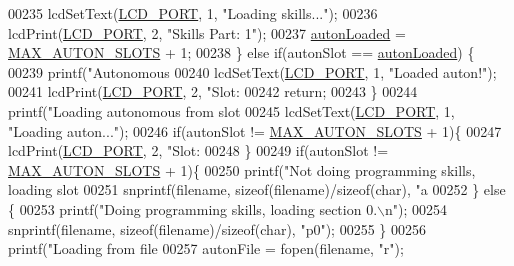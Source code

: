 \begin{DoxyCode}
{{{{{{{{{{{{{{{{{{{{{{{{00235             lcdSetText(\hyperlink{lcdmsg_8h_abcf42bd88b3c36193f301ca25b033875}{LCD\_PORT}, 1, \textcolor{stringliteral}{"Loading skills..."});
00236             lcdPrint(\hyperlink{lcdmsg_8h_abcf42bd88b3c36193f301ca25b033875}{LCD\_PORT},   2, \textcolor{stringliteral}{"Skills Part: 1"});
00237             \hyperlink{autonrecorder_8c_a4e72d907ee74449b71b5e20943f4217e}{autonLoaded} = \hyperlink{autonrecorder_8h_a5173a11a545cb4020fdd139552dc15c1}{MAX\_AUTON\_SLOTS} + 1;
00238         \} \textcolor{keywordflow}{else} \textcolor{keywordflow}{if}(autonSlot == \hyperlink{autonrecorder_8c_a4e72d907ee74449b71b5e20943f4217e}{autonLoaded}) \{
00239             printf(\textcolor{stringliteral}{"Autonomous %
00240             lcdSetText(\hyperlink{lcdmsg_8h_abcf42bd88b3c36193f301ca25b033875}{LCD\_PORT}, 1, \textcolor{stringliteral}{"Loaded auton!"});
00241             lcdPrint(\hyperlink{lcdmsg_8h_abcf42bd88b3c36193f301ca25b033875}{LCD\_PORT},   2, \textcolor{stringliteral}{"Slot: %
00242             \textcolor{keywordflow}{return};
00243         \}
00244         printf(\textcolor{stringliteral}{"Loading autonomous from slot %
00245         lcdSetText(\hyperlink{lcdmsg_8h_abcf42bd88b3c36193f301ca25b033875}{LCD\_PORT}, 1, \textcolor{stringliteral}{"Loading auton..."});
00246         \textcolor{keywordflow}{if}(autonSlot != \hyperlink{autonrecorder_8h_a5173a11a545cb4020fdd139552dc15c1}{MAX\_AUTON\_SLOTS} + 1)\{
00247             lcdPrint(\hyperlink{lcdmsg_8h_abcf42bd88b3c36193f301ca25b033875}{LCD\_PORT}, 2,   \textcolor{stringliteral}{"Slot: %
00248         \}
00249         \textcolor{keywordflow}{if}(autonSlot != \hyperlink{autonrecorder_8h_a5173a11a545cb4020fdd139552dc15c1}{MAX\_AUTON\_SLOTS} + 1)\{
00250             printf(\textcolor{stringliteral}{"Not doing programming skills, loading slot %
00251             snprintf(filename, \textcolor{keyword}{sizeof}(filename)/\textcolor{keyword}{sizeof}(\textcolor{keywordtype}{char}), \textcolor{stringliteral}{"a%
00252         \} \textcolor{keywordflow}{else} \{
00253             printf(\textcolor{stringliteral}{"Doing programming skills, loading section 0.\(\backslash\)n"});
00254             snprintf(filename, \textcolor{keyword}{sizeof}(filename)/\textcolor{keyword}{sizeof}(\textcolor{keywordtype}{char}), \textcolor{stringliteral}{"p0"});
00255         \}
00256         printf(\textcolor{stringliteral}{"Loading from file %
00257         autonFile = fopen(filename, \textcolor{stringliteral}{"r"});
}}}}}}}}}}}}}}}}}}}}}}}}}}}}}}}
\end{DoxyCode}
